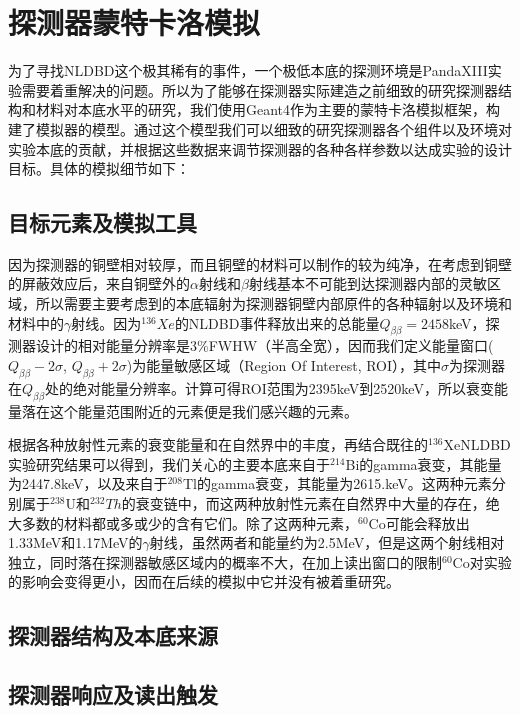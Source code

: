 
\chapter{探测器蒙特卡洛模拟}
\label{chapter:background}

为了寻找NLDBD这个极其稀有的事件，一个极低本底的探测环境是PandaXIII实验需要着重解决的问题。所以为了能够在探测器实际建造之前细致的研究探测器结构和材料对本底水平的研究，我们使用Geant4\supercite{Agostinelli:2002hh}作为主要的蒙特卡洛模拟框架，构建了模拟器的模型。通过这个模型我们可以细致的研究探测器各个组件以及环境对实验本底的贡献，并根据这些数据来调节探测器的各种各样参数以达成实验的设计目标。具体的模拟细节如下：

\section{目标元素及模拟工具}

因为探测器的铜壁相对较厚，而且铜壁的材料可以制作的较为纯净，在考虑到铜壁的屏蔽效应后，来自铜壁外的$\alpha$射线和$\beta$射线基本不可能到达探测器内部的灵敏区域，所以需要主要考虑到的本底辐射为探测器铜壁内部原件的各种辐射以及环境和材料中的$\gamma$射线。因为$^{136}Xe$的NLDBD事件释放出来的总能量$Q_{\beta\beta}=2458$keV，探测器设计的相对能量分辨率是3\%FWHW（半高全宽），因而我们定义能量窗口($Q_{\beta\beta}-2\sigma$, $Q_{\beta\beta}+2\sigma$)为能量敏感区域（Region Of Interest, ROI），其中$\sigma$为探测器在$Q_{\beta\beta}$处的绝对能量分辨率。计算可得ROI范围为2395keV到2520keV，所以衰变能量落在这个能量范围附近的元素便是我们感兴趣的元素。

根据各种放射性元素的衰变能量和在自然界中的丰度，再结合既往的$^{136}$XeNLDBD实验研究结果可以得到，我们关心的主要本底来自于$^{214}$Bi的gamma衰变，其能量为2447.8keV，以及来自于$^{208}$Tl的gamma衰变，其能量为2615.keV。这两种元素分别属于$^{238}$U和$^{232}Th$的衰变链中，而这两种放射性元素在自然界中大量的存在，绝大多数的材料都或多或少的含有它们。除了这两种元素，$^{60}$Co可能会释放出1.33MeV和1.17MeV的$\gamma$射线，虽然两者和能量约为2.5MeV，但是这两个射线相对独立，同时落在探测器敏感区域内的概率不大，在加上读出窗口的限制$^{60}$Co对实验的影响会变得更小，因而在后续的模拟中它并没有被着重研究。

\section{探测器结构及本底来源}

\section{探测器响应及读出触发}

